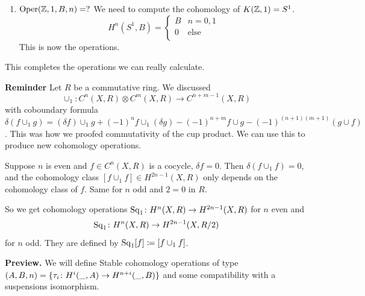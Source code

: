 \documentclass[language=english]{TemplateLecture}
\begin{document}
\begin{example}
\begin{enumerate}
        For example
        \[H^n(K(\IF_2, 1, \IF_2))\cong\Oper(\IF_2, 1, \IF_2, k)\in \set{x \mapsto x^k}\]
        where this is equal to
        \[H^n(\ir P^\infty, \IF_2)\]
        and
        \[H^*(\ir P^\infty, \IF_2) = \IF_2 [\iota_{\IF_2, 1}]\]
        So \(\Oper(\IF_2, 1\IF_2, k) = \set{0, x\mapsto x^k}\).

        We also calculated \(H^*(\ic P^\infty, \iz)= \iz[\iota_{\iz, 2}]\). So this gives
        \[\Oper(\iz, 2, \iz, k) = \begin{cases}
            0 & k \text{ odd} \\
            \iz \set{x\mapsto x^m} & k = 2m \\
        \end{cases}\]

        \item \(\mathrm{Oper}(\mathbb{Z}, 1, B,n) = ?\) We need to compute the cohomology of \(K(\mathbb{Z}, 1) = S^1\).
        \[H^n(S^1, B) = \begin{cases}
            B & n = 0,1 \\
            0 & \text{else} \\
        \end{cases}\]
        This is now the operations.
    \end{enumerate}

    This completes the operations we can really calculate.
\end{example}

\textbf{Reminder} Let \(R\) be a commutative ring. We discussed
\[\cup_1\colon C^n(X,R)\otimes C^m(X,R) \to C^{n+m-1}(X,R)\]
with coboundary formula \(\delta(f\cup_1 g) = (\delta f)\cup_1 g + (-1)^n f\cup_1 (\delta g) - (-1)^{n+m} f\cup g - (-1)^{(n+1)(m+1)} (g\cup f)\). This was how we proofed commutativity of the cup product. We can use this to produce new cohomology operations.

Suppose \(n\) is even and \(f \in C^n(X,R)\) is a cocycle, \(\delta f = 0\). Then \(\delta(f\cup_1 f) = 0\), and the cohomology class \([f\cup_1 f]\in H^{2n-1}(X,R)\) only depends on the cohomology class of \(f\). Same for \(n\) odd and \(2 = 0\) in \(R\).

So we get cohomology operations \(\mathrm{Sq}_1\colon H^n(X,R)\to H^{2n-1}(X,R)\) for \(n\) even and
\[\mathrm{Sq}_1\colon H^n(X,R)\to H^{2n-1}(X,R/2)\]
for \(n\) odd. They are defined by \(\mathrm{Sq}_1[f]\coloneq [f\cup_1 f]\).

\textbf{Preview.} We will define Stable cohomology operations of type \((A,B,n) = \{\tau_i\colon H^i(\_, A)\to H^{n+i}(\_, B)\}\) and some compatibility with a suspensions isomorphism.
\end{document}
